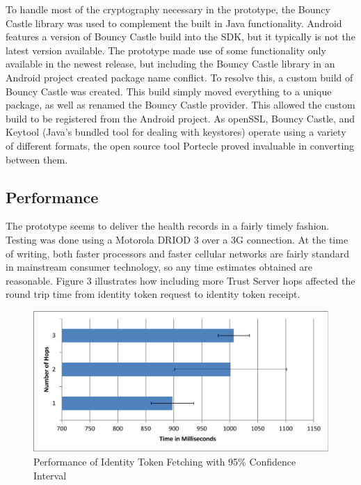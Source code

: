 To handle most of the cryptography necessary in the prototype, the Bouncy Castle\cite{manbouncycastle} library was used to complement the built in Java functionality. Android features a version of Bouncy Castle build into the SDK, but it typically is not the latest version available. The prototype made use of some functionality only available in the newest release, but including the Bouncy Castle library in an Android project created package name conflict. To resolve this, a custom build of Bouncy Castle was created. This build simply moved everything to a unique package, as well as renamed the Bouncy Castle provider. This allowed the custom build to be registered from the Android project. As openSSL, Bouncy Castle, and Keytool (Java's bundled tool for dealing with keystores)\cite{mankeytool} operate using a variety of different formats, the open source tool Portecle\cite{manportecle} proved invaluable in converting between them.

\subsection{Performance}

The prototype seems to deliver the health records in a fairly timely fashion. Testing was done using a Motorola DRIOD 3 over a 3G connection. At the time of writing, both faster processors and faster cellular networks are fairly standard in mainstream consumer technology, so any time estimates obtained are reasonable. Figure 3 illustrates how including more Trust Server hops affected the round trip time from identity token request to identity token receipt.

\begin{figure}[h]
\begin{center}
\includegraphics[scale=.65]{graph1.pdf}
\caption{Performance of Identity Token Fetching with 95\% Confidence Interval}
\end{center}
\end{figure}

